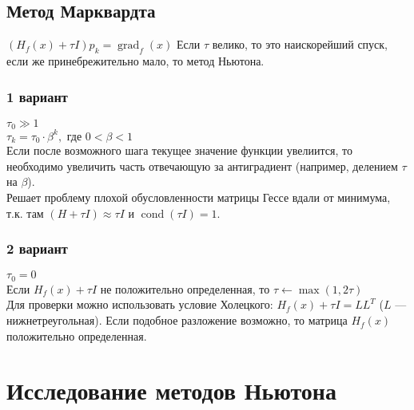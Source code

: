 \documentclass[russian, english]{article}
\begin{document}
\subsection{Метод Марквардта}
$(H_f(x) + \tau I)p_k=\operatorname{grad}_f(x)$
Если $\tau$ велико, то это наискорейший спуск, если же принебрежительно мало, то метод Ньютона.
\subsubsection{1 вариант}
$\tau_0 \gg 1$\\
$\tau_k = \tau_0\cdot \beta^k, \text{ где } 0 < \beta < 1$\\
Если после возможного шага текущее значение функции увелиится, то необходимо увеличить часть отвечающую за антиградиент (например, делением $\tau$ на $\beta$).\\
Решает проблему плохой обусловленности матрицы Гессе вдали от минимума, т.к. там $(H+\tau I)\approx\tau I$ и $\operatorname{cond}(\tau I) = 1$.
\subsubsection{2 вариант}
$\tau_0 = 0$\\
Если $H_f(x) + \tau I$ не положительно определенная, то $\tau \leftarrow \operatorname{max}(1, 2\tau)$\\
Для проверки можно использовать условие Холецкого: $H_f(x)+\tau I = LL^T$ ($L$ --- нижнетреугольная). Если подобное разложение возможно, то матрица $H_f(x)$ положительно определенная.

\section{Исследование методов Ньютона}

\newcommand{\MakePlots}[7]{
	$z(x, y) = #2$\\
	$p_0 = #4$\\
	\begin{tikzpicture}
	\begin{axis}[
		legend style={at={(0.5,-0.1)},anchor=north},
		xlabel = {x},
		ylabel = {y},
		zlabel = {z},
		#6
	]
		\addplot3[surf, opacity=0.8, forget plot, #7] {#1};
		\foreach \suff/\fancy in #5 {
			\edef\temp{\noexpand\addlegendentry{\fancy}}
			\addplot3 table[col sep=tab]{#3/\suff%
Traj.tsv};
			\temp
		}
	\end{axis}
	\end{tikzpicture}\\
	\begingroup
		\toks0={#3}%
		\edef\param{\the\toks0}%
	\expandafter\endgroup
	\ifx\param\empty
	\else
		\csvautotabular[separator=tab]{#3/iters.tsv}\\
	\fi
}
\end{document}
